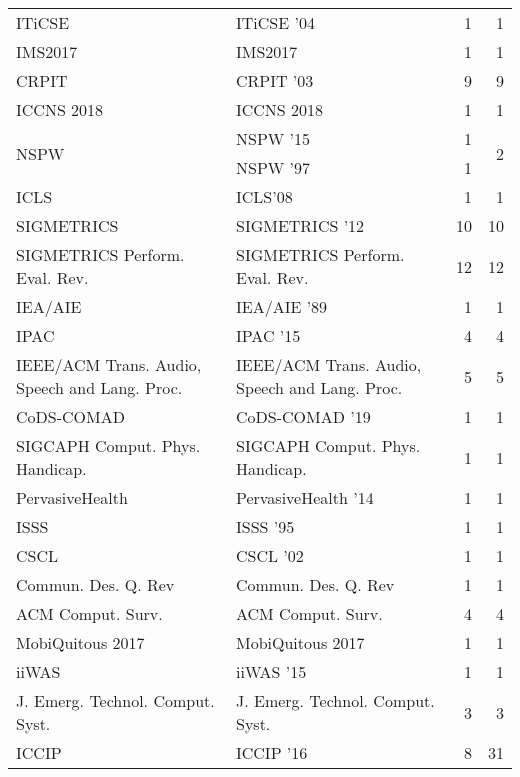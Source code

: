 \begin{table*}[t]
\begin{tabular}{llrr}
\multirow{1}{*}{ITiCSE } & ITiCSE '04 & 1 & \multirow{1}{*}{1}\\
\multirow{1}{*}{IMS2017} & IMS2017 & 1 & \multirow{1}{*}{1}\\
\multirow{1}{*}{CRPIT } & CRPIT '03 & 9 & \multirow{1}{*}{9}\\
\multirow{1}{*}{ICCNS 2018} & ICCNS 2018 & 1 & \multirow{1}{*}{1}\\
\multirow{2}{*}{NSPW } & NSPW '15 & 1 & \multirow{2}{*}{2}\\
& NSPW '97 & 1 &\\
\multirow{1}{*}{ICLS} & ICLS'08 & 1 & \multirow{1}{*}{1}\\
\multirow{1}{*}{SIGMETRICS } & SIGMETRICS '12 & 10 & \multirow{1}{*}{10}\\
\multirow{1}{*}{SIGMETRICS Perform. Eval. Rev.} & SIGMETRICS Perform. Eval. Rev. & 12 & \multirow{1}{*}{12}\\
\multirow{1}{*}{IEA/AIE } & IEA/AIE '89 & 1 & \multirow{1}{*}{1}\\
\multirow{1}{*}{IPAC } & IPAC '15 & 4 & \multirow{1}{*}{4}\\
\multirow{1}{*}{IEEE/ACM Trans. Audio, Speech and Lang. Proc.} & IEEE/ACM Trans. Audio, Speech and Lang. Proc. & 5 & \multirow{1}{*}{5}\\
\multirow{1}{*}{CoDS-COMAD } & CoDS-COMAD '19 & 1 & \multirow{1}{*}{1}\\
\multirow{1}{*}{SIGCAPH Comput. Phys. Handicap.} & SIGCAPH Comput. Phys. Handicap. & 1 & \multirow{1}{*}{1}\\
\multirow{1}{*}{PervasiveHealth } & PervasiveHealth '14 & 1 & \multirow{1}{*}{1}\\
\multirow{1}{*}{ISSS } & ISSS '95 & 1 & \multirow{1}{*}{1}\\
\multirow{1}{*}{CSCL } & CSCL '02 & 1 & \multirow{1}{*}{1}\\
\multirow{1}{*}{Commun. Des. Q. Rev} & Commun. Des. Q. Rev & 1 & \multirow{1}{*}{1}\\
\multirow{1}{*}{ACM Comput. Surv.} & ACM Comput. Surv. & 4 & \multirow{1}{*}{4}\\
\multirow{1}{*}{MobiQuitous 2017} & MobiQuitous 2017 & 1 & \multirow{1}{*}{1}\\
\multirow{1}{*}{iiWAS } & iiWAS '15 & 1 & \multirow{1}{*}{1}\\
\multirow{1}{*}{J. Emerg. Technol. Comput. Syst.} & J. Emerg. Technol. Comput. Syst. & 3 & \multirow{1}{*}{3}\\
\multirow{3}{*}{ICCIP } & ICCIP '16 & 8 & \multirow{3}{*}{31}\\

\end{tabular}
\end{table*}
